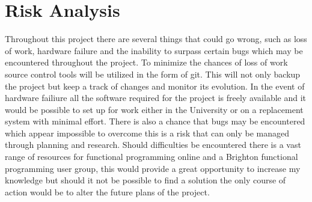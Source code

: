 \documentclass[main.tex]{subfiles}
\begin{document}
\section{Risk Analysis} %
Throughout this project there are several things that could go wrong, such as  loss of work, hardware failure and the inability to surpass certain bugs which may be encountered throughout the project. To minimize the chances of loss of work source control tools will be utilized in the form of git. This will not only backup the project but keep a track of changes and monitor its evolution. In the event of hardware failiure all the software required for the project is freely available and it would be possible to set up for work either in the University or on a replacement system with minimal effort. There is also a chance that bugs may be encountered which appear impossible to overcome this is a risk that can only be managed through planning and research. Should difficulties be encountered there is a vast range of resources for functional programming online and a Brighton functional programming user group, this would provide a great opportunity to increase my knowledge but should it not be possible to find a solution the only course of action would be to alter the future plans of the project.
\end{document}
